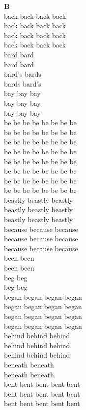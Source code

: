 \vspace{14pt}
\noindent\textbf{\Large B}\\[+12pt]
back back back back\\
back back back back\\
back back back back\\
back back back back\\
bard bard\\
bard bard\\
bard's bards\\
bards bard's\\
bay bay bay\\
bay bay bay\\
bay bay bay\\
be be be be be be be be\\
be be be be be be be be\\
be be be be be be be be\\
be be be be be be be be\\
be be be be be be be be\\
be be be be be be be be\\
be be be be be be be be\\
be be be be be be be be\\
beastly beastly beastly\\
beastly beastly beastly\\
beastly beastly beastly\\
because because because\\
because because because\\
because because because\\
been been\\
been been\\
beg beg\\
beg beg\\
began began began began\\
began began began began\\
began began began began\\
began began began began\\
behind behind behind\\
behind behind behind\\
behind behind behind\\
beneath beneath\\
beneath beneath\\
bent bent bent bent bent\\
bent bent bent bent bent\\
bent bent bent bent bent\\
